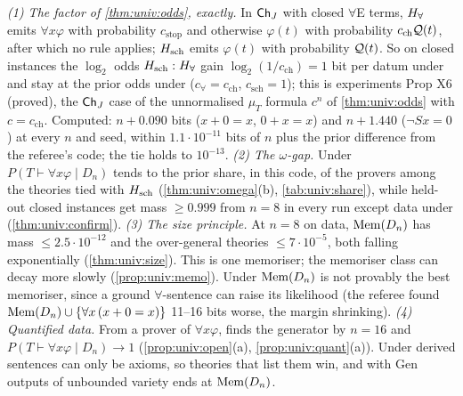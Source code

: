\noindent\emph{(1) The factor of \cref{thm:univ:odds}, exactly.} In $\mathsf{Ch}_{J}$ with closed $\forall$E terms, $H_{\forall}$ emits $\forall x\varphi$ with probability $c_{\mathrm{stop}}$ and otherwise $\varphi(t)$ with probability $c_{\mathrm{ch}}\mathcal{Q}(t)$, after which no rule applies; $H_{\mathrm{sch}}$ emits $\varphi(t)$ with probability $\mathcal{Q}(t)$. So on closed instances the $\log_2$ odds $H_{\mathrm{sch}}:H_{\forall}$ gain $\log_2(1/c_{\mathrm{ch}})=1$ bit per datum under \Lone{} and stay at the prior odds under \Lselc{} ($c_\forall=c_{\mathrm{ch}}$, $c_{\mathrm{sch}}=1$); this is experiments Prop X6 (proved), the $\mathsf{Ch}_{J}$ case of the unnormalised $\mu_T$ formula $c^n$ of \cref{thm:univ:odds} with $c=c_{\mathrm{ch}}$. Computed: $n+0.090$ bits ($x+0=x$, $0+x=x$) and $n+1.440$ ($\neg Sx=0$) at every $n$ and seed, within $1.1\cdot10^{-11}$ bits of $n$ plus the prior difference from the referee's code; the \Lselc{} tie holds to $10^{-13}$.
\emph{(2) The $\omega$-gap.} Under \Lselc{} $P(T\vdash\forall x\varphi\mid D_n)$ tends to the prior share, in this code, of the provers among the theories tied with $H_{\mathrm{sch}}$ (\cref{thm:univ:omega}(b), \cref{tab:univ:share}), while held-out closed instances get mass $\ge0.999$ from $n=8$ in every run except  data under \Lzero{} (\cref{thm:univ:confirm}).
\emph{(3) The size principle.} At $n=8$ on  data, $\mathrm{Mem}(D_n)$ has mass $\le2.5\cdot10^{-12}$ and the over-general theories $\le7\cdot10^{-5}$, both falling exponentially (\cref{thm:univ:size}). This is one memoriser; the memoriser class can decay more slowly (\cref{prop:univ:memo}). Under \Lone{} $\mathrm{Mem}(D_n)$ is not provably the best memoriser, since a ground $\forall$-sentence can raise its likelihood (the referee found $\mathrm{Mem}(D_n)\cup\{\forall x\,(x+0=x)\}$ 11--16 bits worse, the margin shrinking).
\emph{(4) Quantified data.} From a prover of $\forall x\varphi$, \Lone{} finds the generator by $n=16$ and $P(T\vdash\forall x\varphi\mid D_n)\to1$ (\cref{prop:univ:open}(a), \cref{prop:univ:quant}(a)). Under \Lzero{} derived sentences can only be axioms, so theories that list them win, and with Gen outputs of unbounded variety \Lzero{} ends at $\mathrm{Mem}(D_n)$.

